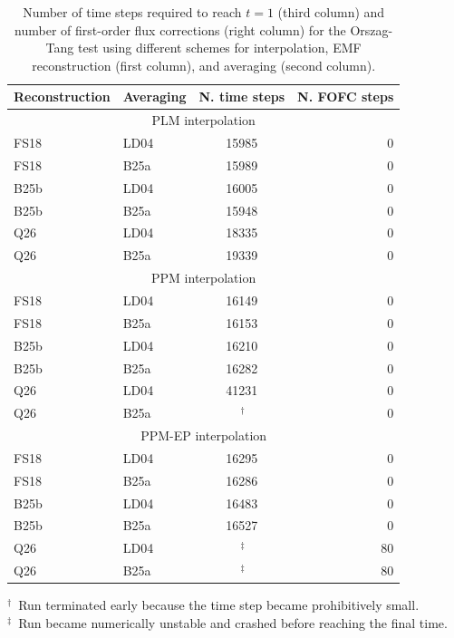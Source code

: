 \begin{table}
\centering
\caption{Number of time steps required to reach $t=1$ (third column) and number of first-order flux corrections (right column) for the Orszag-Tang test using different schemes for interpolation, EMF reconstruction (first column), and averaging (second column).
\label{tab:ot_steps}
}
\begin{tabular}{llcr}
\hline\hline
Reconstruction & Averaging & N. time steps & N. FOFC steps  \\
\hline
\multicolumn{4}{c}{PLM interpolation} \\
\hline
FS18 & LD04  &  15985 & 0 \\
FS18 & B25a  &  15989 & 0 \\
B25b & LD04  &  16005 & 0 \\
B25b & B25a  &  15948 & 0 \\
Q26  & LD04  & 18335 & 0 \\
Q26  & B25a  &  19339 & 0 \\
\hline
\multicolumn{4}{c}{PPM interpolation} \\
\hline
FS18 & LD04  &  16149 & 0 \\
FS18 & B25a  &  16153 & 0 \\
B25b & LD04  &  16210 & 0 \\
B25b & B25a  &  16282 & 0 \\
Q26  & LD04  &   41231 & 0 \\
Q26  & B25a  &  \,$^{\dagger}$ & 0 \\
\hline
\multicolumn{4}{c}{PPM-EP interpolation} \\
\hline
FS18 & LD04  &  16295 & 0 \\
FS18 & B25a  &  16286 & 0 \\
B25b & LD04  &  16483 & 0 \\
B25b & B25a  &  16527 & 0 \\
Q26  & LD04  & \,$^{\ddagger}$ & 80 \\
Q26  & B25a  & \,$^{\ddagger}$ & 80 \\
\hline\hline
\end{tabular}
\vspace{0.5ex}
\begin{flushleft}
\footnotesize
$^{\dagger}$~Run terminated early because the time step became prohibitively small.\\
$^{\ddagger}$~Run became numerically unstable and crashed before reaching the final time.
\end{flushleft}
\end{table}